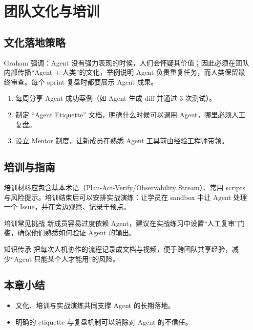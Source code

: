 \section{团队文化与培训}
\subsection{文化落地策略}
Graham 强调：Agent 没有强力表现的时候，人们会怀疑其价值；因此必须在团队内部传播“Agent + 人类”的文化，举例说明 Agent 负责重复任务，而人类保留最终审查。每个 sprint 复盘时都要展示 Agent 成果。

\begin{enumerate}
    \item 每周分享 Agent 成功案例（如 Agent 生成 diff 并通过 3 次测试）。
    \item 制定 “Agent Etiquette” 文档，明确什么时候可以调用 Agent，哪里必须人工复盘。
    \item 设立 Mentor 制度，让新成员在熟悉 Agent 工具前由经验工程师带领。
\end{enumerate}

\subsection{培训与指南}
培训材料应包含基本术语（Plan-Act-Verify/Observability Stream）、常用 scripts 与风险提示。培训结束后可以安排实战演练：让学员在 sandbox 中让 Agent 处理一个 Issue，并在旁边观察、记录干预点。

\begin{warningbox}{培训常见挑战}
新成员容易过度依赖 Agent，建议在实战练习中设置“人工复审”门槛，确保他们熟悉如何验证 Agent 的输出。
\end{warningbox}

\begin{knowledgebox}{知识传承}
把每次人机协作的流程记录成文档与视频，便于跨团队共享经验，减少“Agent 只能某个人才能用”的风险。
\end{knowledgebox}

\subsection{本章小结}
\begin{itemize}
    \item 文化、培训与实战演练共同支撑 Agent 的长期落地。
    \item 明确的 etiquette 与复盘机制可以消除对 Agent 的不信任。
\end{itemize}

